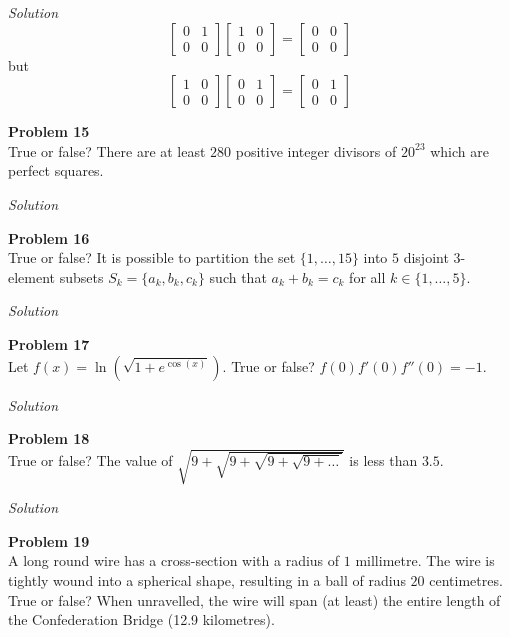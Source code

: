 \documentclass{amsart}
\begin{document}
\textit{Solution}\\
\[ \begin{bmatrix} 0 & 1 \\ 0 & 0 \end{bmatrix} \begin{bmatrix} 1 & 0 \\ 0 & 0 \end{bmatrix} = \begin{bmatrix} 0 & 0 \\ 0 & 0 \end{bmatrix} \]
but
\[ \begin{bmatrix} 1 & 0 \\ 0 & 0 \end{bmatrix} \begin{bmatrix} 0 & 1 \\ 0 & 0 \end{bmatrix} = \begin{bmatrix} 0 & 1 \\ 0 & 0 \end{bmatrix} \]

\textbf{Problem 15}\\
True or false? There are at least $280$ positive integer divisors of $20^{23}$ which are perfect squares.

\textit{Solution}

\textbf{Problem 16}\\
True or false? It is possible to partition the set $\{1,\dots,15\}$ into $5$ disjoint $3$-element subsets $S_k = \{a_k,b_k,c_k\}$ such that $a_k + b_k = c_k$ for all $k \in \{1,\dots,5\}$.

\textit{Solution}

\textbf{Problem 17}\\
Let $f(x) = \ln(\sqrt{1 + e^{\cos(x)}})$.
True or false? $f(0)f'(0)f''(0) = -1$.

\textit{Solution}

\textbf{Problem 18}\\
True or false? The value of $\sqrt{9 + \sqrt{9 + \sqrt{9 + \sqrt{9 + \dots}}}}$ is less than $3.5$.

\textit{Solution}

\textbf{Problem 19}\\
A long round wire has a cross-section with a radius of $1$ millimetre.
The wire is tightly wound into a spherical shape, resulting in a ball of radius $20$ centimetres.
True or false? When unravelled, the wire will span (at least) the entire length of the Confederation Bridge (12.9 kilometres).
\end{document}
